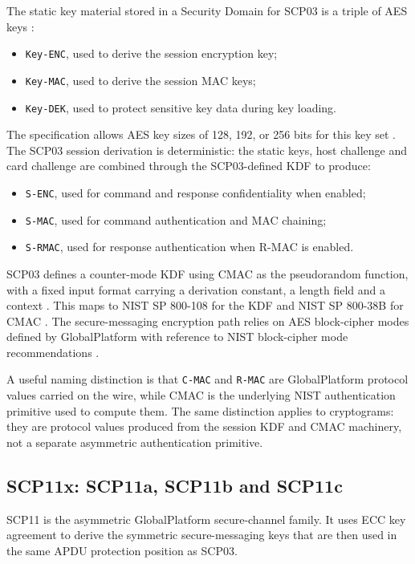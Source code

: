 The static key material stored in a Security Domain for SCP03 is a triple of
AES keys :
\begin{itemize}
\item \texttt{Key-ENC}, used to derive the session encryption key;
\item \texttt{Key-MAC}, used to derive the session MAC keys;
\item \texttt{Key-DEK}, used to protect sensitive key data during key loading.
\end{itemize}

The specification allows AES key sizes of 128, 192, or 256 bits for this key
set . The SCP03 session derivation is deterministic: the
static keys, host challenge and card challenge are combined through the
SCP03-defined KDF to produce:
\begin{itemize}
\item \texttt{S-ENC}, used for command and response confidentiality when
      enabled;
\item \texttt{S-MAC}, used for command authentication and MAC chaining;
\item \texttt{S-RMAC}, used for response authentication when R-MAC is enabled.
\end{itemize}

SCP03 defines a counter-mode KDF using CMAC as the pseudorandom function, with
a fixed input format carrying a derivation constant, a length field and a
context . This maps to NIST SP 800-108 for the KDF
\cite{nist800108} and NIST SP 800-38B for CMAC \cite{nist80038b}. The
secure-messaging encryption path relies on AES block-cipher modes defined by
GlobalPlatform with reference to NIST block-cipher mode recommendations
\cite{nist80038a}.

A useful naming distinction is that \texttt{C-MAC} and \texttt{R-MAC} are
GlobalPlatform protocol values carried on the wire, while CMAC is the
underlying NIST authentication primitive used to compute them. The same
distinction applies to cryptograms: they are protocol values produced from the
session KDF and CMAC machinery, not a separate asymmetric authentication
primitive.

\subsection{SCP11x: SCP11a, SCP11b and SCP11c}

SCP11 is the asymmetric GlobalPlatform secure-channel family. It uses ECC key
agreement to derive the symmetric secure-messaging keys that are then used in
the same APDU protection position as SCP03.

